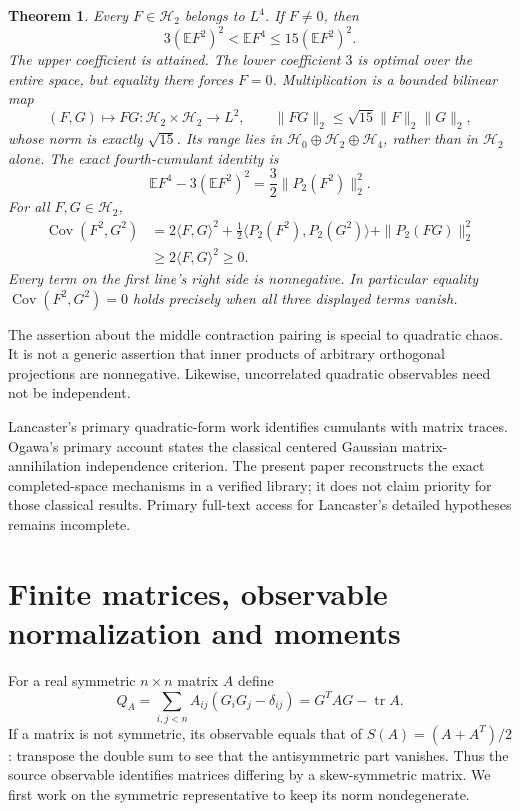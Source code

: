 \documentclass[11pt]{article}
\newtheorem{theorem}{Theorem}[section]
\newcommand{\E}{\mathbb E}
\newcommand{\Hh}{\mathcal H}
\newcommand{\tr}{\operatorname{tr}}
\newcommand{\Cov}{\operatorname{Cov}}
\begin{document}
\begin{theorem}\label{thm:main}
Every $F\in\Hh_2$ belongs to $L^4$. If $F\ne0$, then
\begin{equation}\label{eq:mainbounds}
 3(\E F^2)^2<\E F^4\leq15(\E F^2)^2.
\end{equation}
The upper coefficient is attained. The lower coefficient $3$ is
optimal over the entire space, but equality there forces $F=0$.
Multiplication is a bounded bilinear map
\[
 (F,G)\longmapsto FG:\Hh_2\times\Hh_2\to L^2,
 \qquad \|FG\|_2\leq\sqrt{15}\|F\|_2\|G\|_2,
\]
whose norm is exactly $\sqrt{15}$. Its range lies in
$\Hh_0\oplus\Hh_2\oplus\Hh_4$, rather than in $\Hh_2$ alone.
The exact fourth-cumulant identity is
\begin{equation}\label{eq:cumulant}
 \E F^4-3(\E F^2)^2=\frac32\|P_2(F^2)\|_2^2.
\end{equation}
For all $F,G\in\Hh_2$,
\begin{align}\label{eq:polarized}
 \Cov(F^2,G^2)
 &=2\langle F,G\rangle^2
 +\frac12\langle P_2(F^2),P_2(G^2)\rangle
 +\|P_2(FG)\|_2^2\\
 &\geq2\langle F,G\rangle^2\geq0.\nonumber
\end{align}
Every term on the first line's right side is nonnegative. In
particular equality $\Cov(F^2,G^2)=0$ holds precisely when all
three displayed terms vanish.
\end{theorem}

The assertion about the middle contraction pairing is special to
quadratic chaos. It is not a generic assertion that inner products
of arbitrary orthogonal projections are nonnegative. Likewise,
uncorrelated quadratic observables need not be independent.

Lancaster's primary quadratic-form work \cite{Lancaster} identifies
cumulants with matrix traces. Ogawa's primary account \cite{Ogawa}
states the classical centered Gaussian matrix-annihilation
independence criterion. The present paper reconstructs the exact
completed-space mechanisms in a verified library; it does not claim
priority for those classical results. Primary full-text access for
Lancaster's detailed hypotheses remains incomplete.

\section{Finite matrices, observable normalization and moments}
For a real symmetric $n\times n$ matrix $A$ define
\begin{equation}\label{eq:finiteQ}
 Q_A=\sum_{i,j<n}A_{ij}(G_iG_j-\delta_{ij})
     =G^T A G-\tr A.
\end{equation}
If a matrix is not symmetric, its observable equals that of
$S(A)=(A+A^T)/2$: transpose the double sum to see that the
antisymmetric part vanishes. Thus the source observable identifies
matrices differing by a skew-symmetric matrix. We first work on the
symmetric representative to keep its norm nondegenerate.
\end{document}
